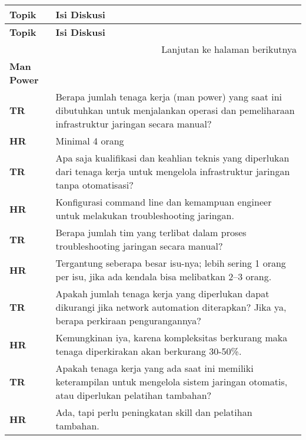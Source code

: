 \begin{longtable}{|p{4cm}|p{10cm}|}
    \hline
    \textbf{Topik} & \textbf{Isi Diskusi} \\
    \hline
    \endfirsthead

    \hline
    \textbf{Topik} & \textbf{Isi Diskusi} \\
    \hline
    \endhead

    \hline
    \multicolumn{2}{|r|}{{Lanjutan ke halaman berikutnya}} \\
    \hline
    \endfoot

    \hline
    \endlastfoot

    \textbf{Man Power} & \\
    \hline
    \textbf{TR} & Berapa jumlah tenaga kerja (man power) yang saat ini dibutuhkan untuk menjalankan operasi dan pemeliharaan infrastruktur jaringan secara manual? \\
    \textbf{HR} & Minimal 4 orang \\
    \hline
    \textbf{TR} & Apa saja kualifikasi dan keahlian teknis yang diperlukan dari tenaga kerja untuk mengelola infrastruktur jaringan tanpa otomatisasi? \\
    \textbf{HR} & Konfigurasi command line dan kemampuan engineer untuk melakukan troubleshooting jaringan. \\
    \hline
    \textbf{TR} & Berapa jumlah tim yang terlibat dalam proses troubleshooting jaringan secara manual? \\
    \textbf{HR} & Tergantung seberapa besar isu-nya; lebih sering 1 orang per isu, jika ada kendala bisa melibatkan 2–3 orang. \\
    \hline
    \textbf{TR} & Apakah jumlah tenaga kerja yang diperlukan dapat dikurangi jika network automation diterapkan? Jika ya, berapa perkiraan pengurangannya? \\
    \textbf{HR} & Kemungkinan iya, karena kompleksitas berkurang maka tenaga diperkirakan akan berkurang 30-50\%. \\
    \hline
    \textbf{TR} & Apakah tenaga kerja yang ada saat ini memiliki keterampilan untuk mengelola sistem jaringan otomatis, atau diperlukan pelatihan tambahan? \\
    \textbf{HR} & Ada, tapi perlu peningkatan skill dan pelatihan tambahan. \\
    \hline


\end{longtable}
